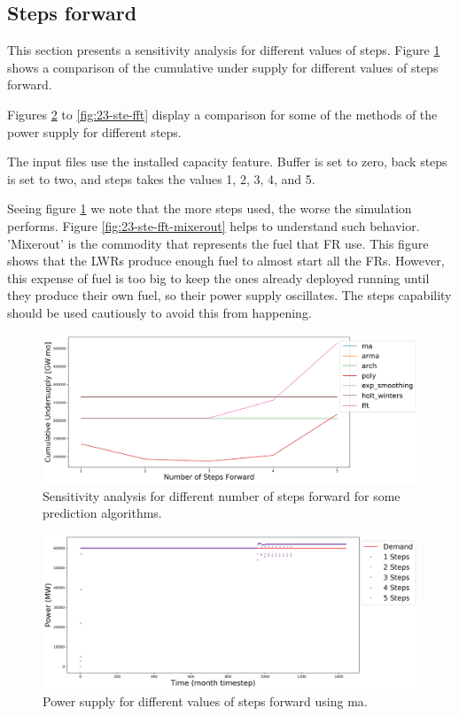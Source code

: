 \documentclass[11pt]{article}
\begin{document}
\subsection{Steps forward}

This section presents a sensitivity analysis for different values of steps.
Figure \ref{fig:23-steps} shows a comparison of the cumulative under supply for different values of steps forward.

Figures \ref{fig:23-ste-ma} to \ref{fig:23-ste-fft} display a comparison for some of the methods of the power supply for different steps.

The input files use the installed capacity feature. Buffer is set to zero, back steps is set to two, and steps takes the values 1, 2, 3, 4, and 5.

Seeing figure \ref{fig:23-steps} we note that the more steps used, the worse the simulation performs. Figure \ref{fig:23-ste-fft-mixerout} helps to understand such behavior. 'Mixerout' is the commodity that represents the fuel that FR use. This figure shows that the LWRs produce enough fuel to almost start all the FRs. However, this expense of fuel is too big to keep the ones already deployed running until they produce their own fuel, so their power supply oscillates. The steps capability should be used cautiously to avoid this from happening.

\begin{figure}[!h]
	\centering
	\includegraphics[width=\textwidth]{23-figures/23-sens-steps.png} 
	\hfill
	\caption{Sensitivity analysis for different number of steps forward for some prediction algorithms.}
	\label{fig:23-steps}
\end{figure}

\begin{figure}[!h]
	\centering
	\includegraphics[width=\textwidth]{23-figures/23-power-buffer0-ma-steps.png} 
	\hfill
	\caption{Power supply for different values of steps forward using ma.}
	\label{fig:23-ste-ma}
\end{figure}
\end{document}
